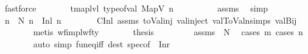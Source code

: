 \begin{isabellebody}
\ fastforce\isanewline
\ \ \ \ \isamarkupfalse%
\ \isamarkupfalse%
\ {\isachardoublequoteopen}tmap{\isacharunderscore}{\kern0pt}lvl\ {\isacharparenleft}{\kern0pt}type{\isacharunderscore}{\kern0pt}of{\isacharunderscore}{\kern0pt}val\ {\isacharparenleft}{\kern0pt}MapV\ n{\isacharparenright}{\kern0pt}{\isacharparenright}{\kern0pt}\ {\isacharequal}{\kern0pt}\ {}{\isachardoublequoteclose}\isanewline
\ \ \ \ \ \ \isamarkupfalse%
\ assms{\isacharparenleft}{\kern0pt}{}{\isacharparenright}{\kern0pt}\ \isamarkupfalse%
\ simp\isanewline
\ \ \ \ \isamarkupfalse%
\ \isamarkupfalse%
\ n{\isacharprime}{\kern0pt}\ \ N{\isacharcolon}{\kern0pt}\ {\isachardoublequoteopen}n\ {\isacharequal}{\kern0pt}\ Inl\ n{\isacharprime}{\kern0pt}{\isachardoublequoteclose}\isanewline
\ \ \ \ \ \ \isamarkupfalse%
\ C{}Inl\ assms\ toVal{}{}{}{}{\isacharunderscore}{\kern0pt}inj\ val{\isachardot}{\kern0pt}inject{\isacharparenleft}{\kern0pt}{}{\isacharparenright}{\kern0pt}\ val{}ToValn{\isachardot}{\kern0pt}simps{\isacharparenleft}{\kern0pt}{}{\isacharparenright}{\kern0pt}\ valBij\isanewline
\ \ \ \ \ \ \isamarkupfalse%
\ {\isacharparenleft}{\kern0pt}metis\ wf{\isacharunderscore}{\kern0pt}impl{\isacharunderscore}{\kern0pt}wf{\isacharunderscore}{\kern0pt}ty{\isacharparenright}{\kern0pt}\isanewline
\ \ \ \ \isamarkupfalse%
\ \isamarkupfalse%
\ {\isacharquery}{\kern0pt}thesis\ \isanewline
\ \ \ \ \ \ \isamarkupfalse%
\ assms{\isacharparenleft}{\kern0pt}{}{\isacharcomma}{\kern0pt}{}{\isacharparenright}{\kern0pt}\ {}\ N\ \isamarkupfalse%
\ {\isacharparenleft}{\kern0pt}cases\ m{\isacharprime}{\kern0pt}{\isacharsemicolon}{\kern0pt}\ cases\ n{\isacharprime}{\kern0pt}{\isacharparenright}{\kern0pt}\isanewline
\ \ \ \ \ \ \isamarkupfalse%
\ {\isacharparenleft}{\kern0pt}auto\ simp{\isacharcolon}{\kern0pt}\ fun{\isacharunderscore}{\kern0pt}eq{\isacharunderscore}{\kern0pt}iff\ dest{\isacharcolon}{\kern0pt}\ spec{\isacharbrackleft}{\kern0pt}of\ {\isacharunderscore}{\kern0pt}\ {\isachardoublequoteopen}Inr\ {\isacharunderscore}{\kern0pt}{\isachardoublequoteclose}{\isacharbrackright}{\kern0pt}{\isacharparenright}{\kern0pt}\isanewline
\ \ \isamarkupfalse%
\isanewline

\end{isabellebody}
